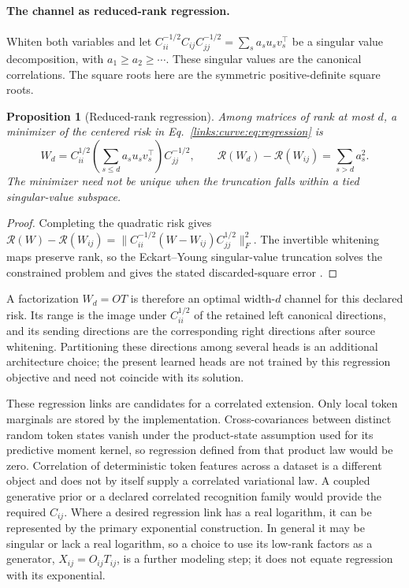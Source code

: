 \documentclass[11pt]{article}
\newtheorem{proposition}[theorem]{Proposition}
\theoremstyle{definition}
\theoremstyle{remark}
\begin{document}
\paragraph{The channel as reduced-rank regression.}
Whiten both variables and let
$C_{ii}^{-1/2}C_{ij}C_{jj}^{-1/2}=\sum_s a_su_sv_s^\top$
be a singular value decomposition, with $a_1\ge a_2\ge\cdots$. These singular values are the canonical correlations. The square roots here are the symmetric positive-definite square roots.
\begin{proposition}[Reduced-rank regression]
\label{links:curve:prop:rrr}
Among matrices of rank at most $d$, a minimizer of the centered risk in Eq.~\eqref{links:curve:eq:regression} is
\begin{equation}
W_d=C_{ii}^{1/2}\left(\sum_{s\le d}a_su_sv_s^\top\right)C_{jj}^{-1/2},
\qquad \mathcal R(W_d)-\mathcal R(W_{ij})=\sum_{s>d}a_s^2.
\label{links:curve:eq:rrr}
\end{equation}
The minimizer need not be unique when the truncation falls within a tied singular-value subspace.
\end{proposition}
\begin{proof}
Completing the quadratic risk gives
$\mathcal R(W)-\mathcal R(W_{ij})=\|C_{ii}^{-1/2}(W-W_{ij})C_{jj}^{1/2}\|_F^2$.
The invertible whitening maps preserve rank, so the Eckart--Young singular-value truncation solves the constrained problem and gives the stated discarded-square error \cite{links:izenman1975,links:reinsel1998}.
\end{proof}
A factorization $W_d=OT$ is therefore an optimal width-$d$ channel for this declared risk. Its range is the image under $C_{ii}^{1/2}$ of the retained left canonical directions, and its sending directions are the corresponding right directions after source whitening. Partitioning these directions among several heads is an additional architecture choice; the present learned heads are not trained by this regression objective and need not coincide with its solution.

These regression links are candidates for a correlated extension. Only local token marginals are stored by the implementation. Cross-covariances between distinct random token states vanish under the product-state assumption used for its predictive moment kernel, so regression defined from that product law would be zero. Correlation of deterministic token features across a dataset is a different object and does not by itself supply a correlated variational law. A coupled generative prior or a declared correlated recognition family would provide the required $C_{ij}$. Where a desired regression link has a real logarithm, it can be represented by the primary exponential construction. In general it may be singular or lack a real logarithm, so a choice to use its low-rank factors as a generator, $X_{ij}=O_{ij}T_{ij}$, is a further modeling step; it does not equate regression with its exponential.
\end{document}
